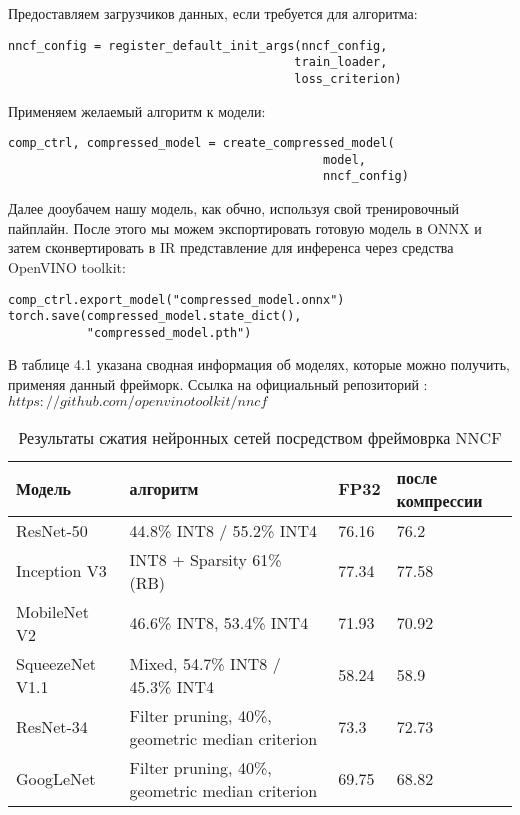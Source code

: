 \documentclass[oneside,final,12pt]{extreport}
\begin{document}
Предоставляем загрузчиков данных, если требуется для алгоритма:
\begin{lstlisting}
nncf_config = register_default_init_args(nncf_config, 
                                        train_loader, 
                                        loss_criterion)
\end{lstlisting}

Применяем желаемый алгоритм к модели:
\begin{lstlisting}
comp_ctrl, compressed_model = create_compressed_model(
                                            model, 
                                            nncf_config)
\end{lstlisting}

Далее дооубачем нашу модель, как обчно, используя свой тренировочный пайплайн. После этого мы можем экспортировать готовую модель в ONNX и затем сконвертировать в IR представление для инференса через средства OpenVINO toolkit:
\begin{lstlisting}
comp_ctrl.export_model("compressed_model.onnx")
torch.save(compressed_model.state_dict(), 
           "compressed_model.pth")
\end{lstlisting}

В таблице 4.1 указана сводная информация об моделях, которые можно получить, применяя данный фрейморк. Ссылка на официальный репозиторий : $https://github.com/openvinotoolkit/nncf$

\begin{table}[H]
\caption{Результаты сжатия нейронных сетей посредством фреймоврка NNCF}
\label{table_2}
\begin{tabularx}{\textwidth}{|X|X|X|X|} %
\hline
Модель & алгоритм & FP32 & после компрессии \\ \hline
ResNet-50 & 44.8\% INT8 / 55.2\% INT4  & 76.16 & 76.2 \\ \hline
Inception V3 & INT8 + Sparsity 61\% (RB)  & 77.34 & 77.58 \\ \hline
MobileNet V2 & 46.6\% INT8, 53.4\% INT4  & 71.93 & 70.92 \\ \hline 
SqueezeNet V1.1 & Mixed, 54.7\% INT8 / 45.3\% INT4  & 58.24 & 58.9 \\ \hline
ResNet-34 & Filter pruning, 40\%, geometric median criterion  & 73.3 & 72.73 \\ \hline
GoogLeNet & Filter pruning, 40\%, geometric median criterion  & 69.75 & 68.82 \\ \hline
\end{tabularx}
\end{table}
\end{document}
